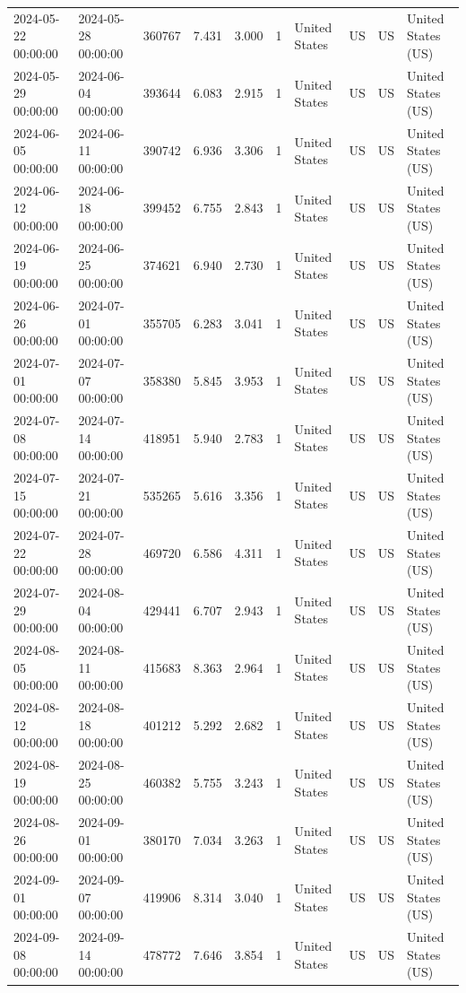 \begin{tabular}{llrrrlllll}
2024-05-22 00:00:00 & 2024-05-28 00:00:00 & 360767 & 7.431 & 3.000 & 1 & United States & US & US & United States (US) \\
2024-05-29 00:00:00 & 2024-06-04 00:00:00 & 393644 & 6.083 & 2.915 & 1 & United States & US & US & United States (US) \\
2024-06-05 00:00:00 & 2024-06-11 00:00:00 & 390742 & 6.936 & 3.306 & 1 & United States & US & US & United States (US) \\
2024-06-12 00:00:00 & 2024-06-18 00:00:00 & 399452 & 6.755 & 2.843 & 1 & United States & US & US & United States (US) \\
2024-06-19 00:00:00 & 2024-06-25 00:00:00 & 374621 & 6.940 & 2.730 & 1 & United States & US & US & United States (US) \\
2024-06-26 00:00:00 & 2024-07-01 00:00:00 & 355705 & 6.283 & 3.041 & 1 & United States & US & US & United States (US) \\
2024-07-01 00:00:00 & 2024-07-07 00:00:00 & 358380 & 5.845 & 3.953 & 1 & United States & US & US & United States (US) \\
2024-07-08 00:00:00 & 2024-07-14 00:00:00 & 418951 & 5.940 & 2.783 & 1 & United States & US & US & United States (US) \\
2024-07-15 00:00:00 & 2024-07-21 00:00:00 & 535265 & 5.616 & 3.356 & 1 & United States & US & US & United States (US) \\
2024-07-22 00:00:00 & 2024-07-28 00:00:00 & 469720 & 6.586 & 4.311 & 1 & United States & US & US & United States (US) \\
2024-07-29 00:00:00 & 2024-08-04 00:00:00 & 429441 & 6.707 & 2.943 & 1 & United States & US & US & United States (US) \\
2024-08-05 00:00:00 & 2024-08-11 00:00:00 & 415683 & 8.363 & 2.964 & 1 & United States & US & US & United States (US) \\
2024-08-12 00:00:00 & 2024-08-18 00:00:00 & 401212 & 5.292 & 2.682 & 1 & United States & US & US & United States (US) \\
2024-08-19 00:00:00 & 2024-08-25 00:00:00 & 460382 & 5.755 & 3.243 & 1 & United States & US & US & United States (US) \\
2024-08-26 00:00:00 & 2024-09-01 00:00:00 & 380170 & 7.034 & 3.263 & 1 & United States & US & US & United States (US) \\
2024-09-01 00:00:00 & 2024-09-07 00:00:00 & 419906 & 8.314 & 3.040 & 1 & United States & US & US & United States (US) \\
2024-09-08 00:00:00 & 2024-09-14 00:00:00 & 478772 & 7.646 & 3.854 & 1 & United States & US & US & United States (US) \\

\end{tabular}
